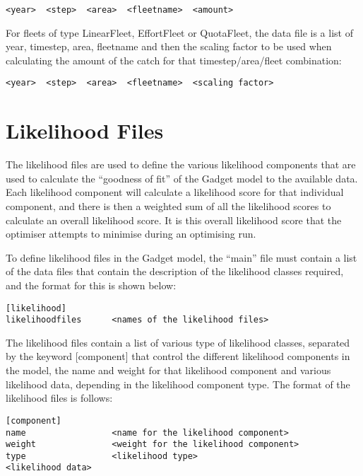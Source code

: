 \documentclass[]{book}
\begin{document}
\begin{verbatim}
<year>  <step>  <area>  <fleetname>  <amount>
\end{verbatim}

For fleets of type LinearFleet, EffortFleet or QuotaFleet, the data file
is a list of year, timestep, area, fleetname and then the scaling factor
to be used when calculating the amount of the catch for that
timestep/area/fleet combination:

\begin{verbatim}
<year>  <step>  <area>  <fleetname>  <scaling factor>
\end{verbatim}

\hypertarget{chap:like}{%
\chapter{Likelihood Files}\label{chap:like}}

The likelihood files are used to define the various likelihood
components that are used to calculate the ``goodness of fit'' of the
Gadget model to the available data. Each likelihood component will
calculate a likelihood score for that individual component, and there is
then a weighted sum of all the likelihood scores to calculate an overall
likelihood score. It is this overall likelihood score that the optimiser
attempts to minimise during an optimising run.

To define likelihood files in the Gadget model, the ``main'' file must
contain a list of the data files that contain the description of the
likelihood classes required, and the format for this is shown below:

\begin{verbatim}
[likelihood]
likelihoodfiles      <names of the likelihood files>
\end{verbatim}

The likelihood files contain a list of various type of likelihood
classes, separated by the keyword {[}component{]} that control the
different likelihood components in the model, the name and weight for
that likelihood component and various likelihood data, depending in the
likelihood component type. The format of the likelihood files is
follows:

\begin{verbatim}
[component]
name                 <name for the likelihood component>
weight               <weight for the likelihood component>
type                 <likelihood type>
<likelihood data>
\end{verbatim}
\end{document}
